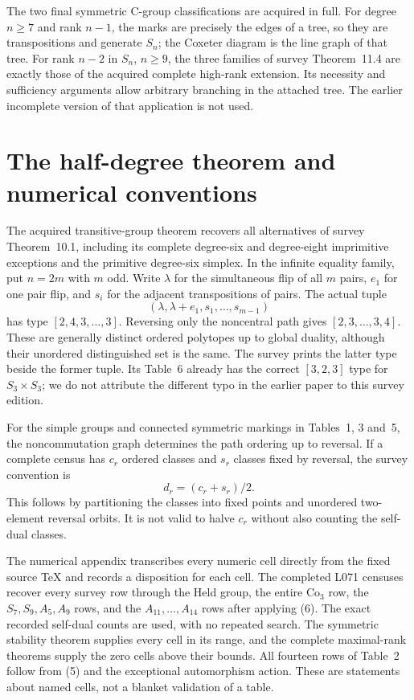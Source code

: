 \documentclass[11pt]{article}
\begin{document}
The two final symmetric C-group classifications are acquired in full.
For degree $n\ge7$ and rank $n-1$, the marks are precisely the edges
of a tree, so they are transpositions and generate $S_n$; the Coxeter
diagram is the line graph of that tree. For rank $n-2$ in $S_n$,
$n\ge9$, the three families of survey Theorem~11.4 are exactly those
of the acquired complete high-rank extension. Its necessity and
sufficiency arguments allow arbitrary branching in the attached tree.
The earlier incomplete version of that application is not used.

\section{The half-degree theorem and numerical conventions}
The acquired transitive-group theorem recovers all alternatives of
survey Theorem~10.1, including its complete degree-six and degree-eight
imprimitive exceptions and the primitive degree-six simplex. In the
infinite equality family, put $n=2m$ with $m$ odd. Write $\lambda$
for the simultaneous flip of all $m$ pairs, $e_1$ for one pair flip,
and $s_i$ for the adjacent transpositions of pairs. The actual tuple
\[
                     (\lambda,\lambda+e_1,s_1,\ldots,s_{m-1})
\]
has type $[2,4,3,\ldots,3]$. Reversing only the noncentral path gives
$[2,3,\ldots,3,4]$. These are generally distinct ordered polytopes
up to global duality, although their unordered distinguished set is
the same. The survey prints the latter type beside the former tuple.
Its Table~6 already has the correct $[3,2,3]$ type for $S_3\times S_3$;
we do not attribute the different typo in the earlier paper to this
survey edition.

For the simple groups and connected symmetric markings in Tables~1,
3 and~5, the noncommutation graph determines the path ordering up to
reversal. If a complete census has $c_r$ ordered classes and $s_r$
classes fixed by reversal, the survey convention is
\[
                            d_r=(c_r+s_r)/2.                  \tag{6}
\]
This follows by partitioning the classes into fixed points and
unordered two-element reversal orbits. It is not valid to halve
$c_r$ without also counting the self-dual classes.

The numerical appendix transcribes every numeric cell directly from
the fixed source TeX and records a disposition for each cell. The
completed L071 censuses recover every survey row through the Held
group, the entire $\mathrm{Co}_3$ row, the $S_7,S_9,A_5,A_9$ rows,
and the $A_{11},\ldots,A_{14}$ rows after applying (6). The exact
recorded self-dual counts are used, with no repeated search. The
symmetric stability theorem supplies every cell in its range, and
the complete maximal-rank theorems supply the zero cells above their
bounds. All fourteen rows of Table~2 follow from (5) and the
exceptional automorphism action. These are statements about named
cells, not a blanket validation of a table.
\end{document}
